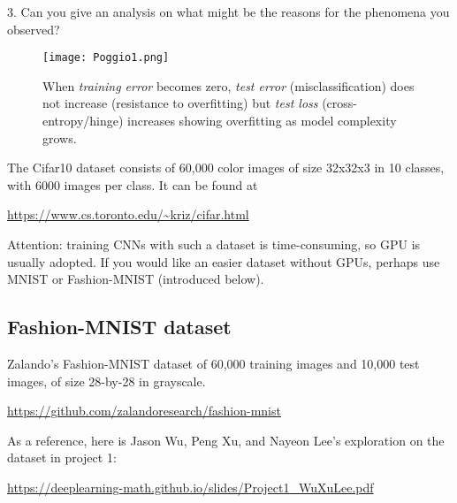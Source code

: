 \documentclass[11pt]{article}
\begin{document}
3. Can you give an analysis on what might be the reasons for the phenomena you observed? 

\begin{figure}
\center
\texttt{[image: Poggio1.png]}  
\caption{When \emph{training error} becomes zero, \emph{test error} (misclassification) does not increase (resistance to overfitting) but \emph{test loss} (cross-entropy/hinge) increases showing overfitting as model complexity grows.}
\label{fig:Poggio1}
\end{figure}

The Cifar10 dataset consists of 60,000 color images of size 32x32x3 in 10 classes, with 6000 images per class. It can be found at 

\url{https://www.cs.toronto.edu/~kriz/cifar.html}

\noindent Attention: training CNNs with such a dataset is time-consuming, so GPU is usually adopted. If you would like an easier dataset without GPUs, perhaps use MNIST or Fashion-MNIST (introduced below).

\subsection{Fashion-MNIST dataset}

Zalando's Fashion-MNIST dataset of 60,000 training images and 10,000 test images, of size 28-by-28 in grayscale. 

\url{https://github.com/zalandoresearch/fashion-mnist}

As a reference, here is Jason Wu, Peng Xu, and Nayeon Lee's exploration on the dataset in project 1:

\url{https://deeplearning-math.github.io/slides/Project1_WuXuLee.pdf}
\end{document}

